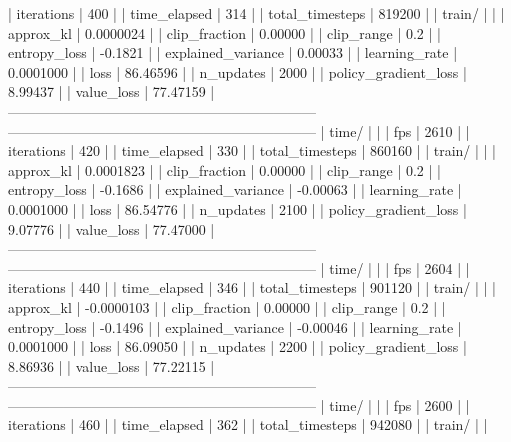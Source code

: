|    iterations           |          400 |
|    time_elapsed         |          314 |
|    total_timesteps      |       819200 |
| train/                  |              |
|    approx_kl            |    0.0000024 |
|    clip_fraction        |      0.00000 |
|    clip_range           |          0.2 |
|    entropy_loss         |      -0.1821 |
|    explained_variance   |      0.00033 |
|    learning_rate        |    0.0001000 |
|    loss                 |     86.46596 |
|    n_updates            |         2000 |
|    policy_gradient_loss |      8.99437 |
|    value_loss           |     77.47159 |
------------------------------------------------------------------
------------------------------------------------------------------
| time/                   |              |
|    fps                  |         2610 |
|    iterations           |          420 |
|    time_elapsed         |          330 |
|    total_timesteps      |       860160 |
| train/                  |              |
|    approx_kl            |    0.0001823 |
|    clip_fraction        |      0.00000 |
|    clip_range           |          0.2 |
|    entropy_loss         |      -0.1686 |
|    explained_variance   |     -0.00063 |
|    learning_rate        |    0.0001000 |
|    loss                 |     86.54776 |
|    n_updates            |         2100 |
|    policy_gradient_loss |      9.07776 |
|    value_loss           |     77.47000 |
------------------------------------------------------------------
------------------------------------------------------------------
| time/                   |              |
|    fps                  |         2604 |
|    iterations           |          440 |
|    time_elapsed         |          346 |
|    total_timesteps      |       901120 |
| train/                  |              |
|    approx_kl            |   -0.0000103 |
|    clip_fraction        |      0.00000 |
|    clip_range           |          0.2 |
|    entropy_loss         |      -0.1496 |
|    explained_variance   |     -0.00046 |
|    learning_rate        |    0.0001000 |
|    loss                 |     86.09050 |
|    n_updates            |         2200 |
|    policy_gradient_loss |      8.86936 |
|    value_loss           |     77.22115 |
------------------------------------------------------------------
------------------------------------------------------------------
| time/                   |              |
|    fps                  |         2600 |
|    iterations           |          460 |
|    time_elapsed         |          362 |
|    total_timesteps      |       942080 |
| train/                  |              |
